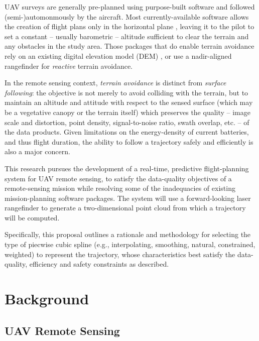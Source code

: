 \documentclass[doc]{apa6}
\begin{document}
UAV surveys are generally pre-planned using purpose-built software and followed (semi-)automonmously by the aircraft. Most currently-available software allows the creation of flight plans only in the horizontal plane \parencite[e.g.,][]{ArduPilot2018,DJI2018a,Microdrones2018,Group2018,UAVToolbox2018}, leaving it to the pilot to set a constant -- usually barometric -- altitude sufficient to clear the terrain and any obstacles in the study area. Those packages that do enable terrain avoidance rely on an  existing digital elevation model (DEM) \parencite[e.g.,][]{PrecisionHawk2018,UgCS2018,MapsMadeEasy2018}, or use a nadir-aligned rangefinder for \emph{reactive} terrain avoidance.

In the remote sensing context, \emph{terrain avoidance} is distinct from \emph{surface following}: the objective is not merely to avoid colliding with the terrain, but to maintain an altitude and attitude with respect to the sensed surface (which may be a vegetative canopy or the terrain itself) which preserves the quality -- image scale and distortion, point density, signal-to-noise ratio, swath overlap, etc. -- of the data products. Given limitations on the energy-density of current batteries, and thus flight duration, the ability to follow a trajectory safely and efficiently is also a major concern.

This research pursues the development of a real-time, predictive flight-planning system for UAV remote sensing, to satisfy the data-quality objectives of a remote-sensing mission while resolving some of the inadequacies of existing mission-planning software packages. The system will use a forward-looking laser rangefinder to generate a two-dimensional point cloud from which a trajectory will be computed.

Specifically, this proposal outlines a rationale and methodology for selecting the type of piecwise cubic spline (e.g., interpolating, smoothing, natural, constrained, weighted) to represent the trajectory, whose characteristics best satisfy the data-quality, efficiency and safety constraints as described. 



\section{Background}

\subsection{UAV Remote Sensing}
\end{document}
